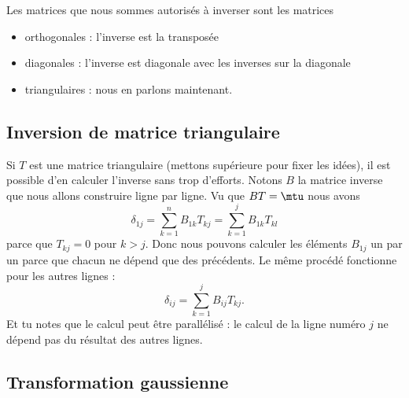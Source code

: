 Les matrices que nous sommes autorisés à inverser sont les matrices
\begin{itemize}
    \item orthogonales : l'inverse est la transposée
    \item diagonales : l'inverse est diagonale avec les inverses sur la diagonale
    \item triangulaires : nous en parlons maintenant.
\end{itemize}

\subsection{Inversion de matrice triangulaire}

Si \( T\) est une matrice triangulaire (mettons supérieure pour fixer les idées), il est possible d'en calculer l'inverse sans trop d'efforts. Notons \( B\) la matrice inverse que nous allons construire ligne par ligne. Vu que \( BT=\mtu\) nous avons
\begin{equation}
    \delta_{1j}=\sum_{k=1}^nB_{1k}T_{kj}=\sum_{k=1}^jB_{1k}T_{kl}
\end{equation}
parce que \( T_{kj}=0\) pour \( k>j\). Donc nous pouvons calculer les éléments \( B_{1j} \) un par un parce que chacun ne dépend que des précédents. Le même procédé fonctionne pour les autres lignes :
\begin{equation}
    \delta_{ij}=\sum_{k=1}^jB_{ij}T_{kj}.
\end{equation}
Et tu notes que le calcul peut être parallélisé : le calcul de la ligne numéro \( j\) ne dépend pas du résultat des autres lignes.

\subsection{Transformation gaussienne}

